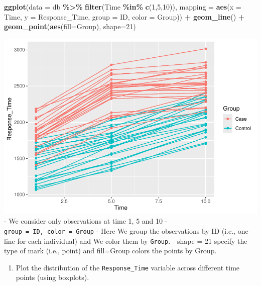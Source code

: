 \documentclass[
]{article}
\newenvironment{Shaded}{\begin{snugshade}}{\end{snugshade}}
\newcommand{\AttributeTok}[1]{\textcolor[rgb]{0.13,0.29,0.53}{#1}}
\newcommand{\DecValTok}[1]{\textcolor[rgb]{0.00,0.00,0.81}{#1}}
\newcommand{\FunctionTok}[1]{\textcolor[rgb]{0.13,0.29,0.53}{\textbf{#1}}}
\newcommand{\NormalTok}[1]{#1}
\newcommand{\SpecialCharTok}[1]{\textcolor[rgb]{0.81,0.36,0.00}{\textbf{#1}}}
\providecommand{\tightlist}{%
  \setlength{\itemsep}{0pt}\setlength{\parskip}{0pt}}
\begin{document}
\begin{Shaded}
\begin{Highlighting}[]
\FunctionTok{ggplot}\NormalTok{(}\AttributeTok{data =}\NormalTok{ db }\SpecialCharTok{\%\textgreater{}\%} \FunctionTok{filter}\NormalTok{(Time }\SpecialCharTok{\%in\%} \FunctionTok{c}\NormalTok{(}\DecValTok{1}\NormalTok{,}\DecValTok{5}\NormalTok{,}\DecValTok{10}\NormalTok{)), }
       \AttributeTok{mapping =} \FunctionTok{aes}\NormalTok{(}\AttributeTok{x =}\NormalTok{ Time, }\AttributeTok{y =}\NormalTok{ Response\_Time, }\AttributeTok{group =}\NormalTok{ ID, }\AttributeTok{color =}\NormalTok{ Group)) }\SpecialCharTok{+} 
  \FunctionTok{geom\_line}\NormalTok{() }\SpecialCharTok{+}
   \FunctionTok{geom\_point}\NormalTok{(}\FunctionTok{aes}\NormalTok{(}\AttributeTok{fill=}\NormalTok{Group),}
              \AttributeTok{shape=}\DecValTok{21}\NormalTok{)}
\end{Highlighting}
\end{Shaded}

\includegraphics{Simulated_example_files/figure-latex/unnamed-chunk-11-1.pdf}
- We consider only observations at time 1, 5 and 10 -
\texttt{group\ =\ ID,\ color\ =\ Group} - Here We group the observations
by ID (i.e., one line for each individual) and We color them by
\texttt{Group}. - shape = 21 specify the type of mark (i.e., point) and
fill=Group colors the points by Group.

\begin{enumerate}
\def\labelenumi{\roman{enumi}.}
\tightlist
\item
  Plot the distribution of the \texttt{Response\_Time} variable across
  different time points (using boxplots).
\end{enumerate}
\end{document}
